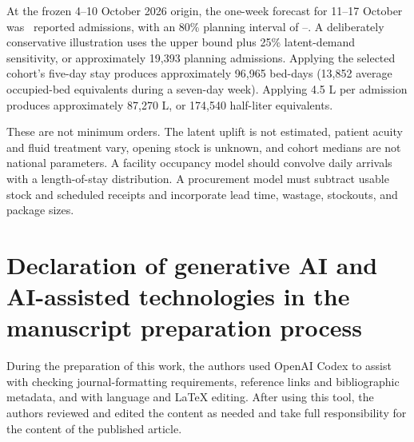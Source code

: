\documentclass[11pt]{article}
\begin{document}
At the frozen 4--10 October 2026 origin, the one-week forecast for 11--17 October was \OneWeekForecast\ reported admissions, with an 80\% planning interval of \OneWeekLower--\OneWeekUpper. A deliberately conservative illustration uses the upper bound plus 25\% latent-demand sensitivity, or approximately 19,393 planning admissions. Applying the selected cohort's five-day stay produces approximately 96,965 bed-days (13,852 average occupied-bed equivalents during a seven-day week). Applying 4.5 L per admission produces approximately 87,270 L, or 174,540 half-liter equivalents.

These are not minimum orders. The latent uplift is not estimated, patient acuity and fluid treatment vary, opening stock is unknown, and cohort medians are not national parameters. A facility occupancy model should convolve daily arrivals with a length-of-stay distribution. A procurement model must subtract usable stock and scheduled receipts and incorporate lead time, wastage, stockouts, and package sizes.

\section*{Declaration of generative AI and AI-assisted technologies in the manuscript preparation process}

During the preparation of this work, the authors used OpenAI Codex to assist with checking journal-formatting requirements, reference links and bibliographic metadata, and with language and LaTeX editing. After using this tool, the authors reviewed and edited the content as needed and take full responsibility for the content of the published article.

\printbibliography
\end{document}
